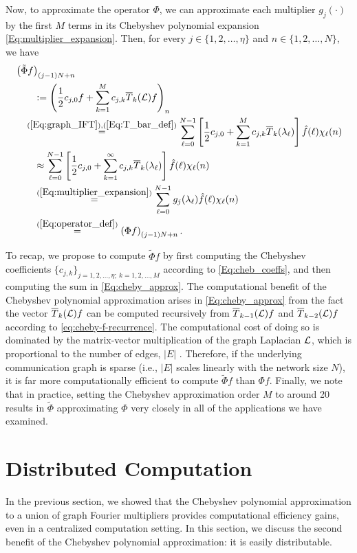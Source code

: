 \documentclass[conference]{IEEEtran}
\renewcommand{\l}{\ell}
\renewcommand{\L}{{\mathcal{L}}}
\def\L{{\cal L}}
\begin{document}
Now, to approximate the operator $\Phi$, we can approximate each multiplier $g_j(\cdot)$ by the first $M$ terms in its Chebyshev polynomial expansion \eqref{Eq:multiplier_expansion}.
Then,
for every $j \in \{1,2,\ldots,\eta\}$ and $n \in \{1,2,\ldots,N\}$, we have
\begin{align} \label{Eq:cheby_approx}
&\left(\tilde{\Phi} f\right)_{(j-1)N+n} \nonumber \\
&\quad\quad := \left(\frac{1}{2}c_{j,0}f+\sum_{k=1}^{M}c_{j,k}\overline{T}_k(\L)f\right)_n \\
&\quad \stackrel{(\ref{Eq:graph_IFT}), (\ref{Eq:T_bar_def})}= \sum_{\l=0}^{N-1}\left[\frac{1}{2}c_{j,0}+\sum_{k=1}^{M}c_{j,k}\overline{T}_k(\lambda_{\l})\right] \hat{f}(\l) \chi_{\l}(n) \nonumber \\
& \quad\quad \approx \sum_{\l=0}^{N-1}\left[\frac{1}{2}c_{j,0}+\sum_{k=1}^{\infty}c_{j,k}\overline{T}_k(\lambda_{\l})\right] \hat{f}(\l) \chi_{\l}(n)  \nonumber \\
&\quad\quad \stackrel{(\ref{Eq:multiplier_expansion})} = \sum_{\l=0}^{N-1}g_j(\lambda_{\l}) \hat{f}(\l) \chi_{\l}(n) \nonumber
\\
&\quad\quad \stackrel{(\ref{Eq:operator_def})} = \left(\Phi f\right)_{(j-1)N+n} . \nonumber
\end{align}


To recap, we propose to compute $\tilde{\Phi}f$ by first computing the Chebyshev coefficients $\{c_{j,k}\}_{j=1,2,\ldots,\eta;~k=1,2,\ldots,M}$ according to \eqref{Eq:cheb_coeffs}, and then computing the sum in \eqref{Eq:cheby_approx}. The computational benefit of the Chebyshev polynomial approximation arises in \eqref{Eq:cheby_approx}
from the fact the vector $\overline{T}_k(\L)f$ can be computed recursively from $\overline{T}_{k-1}(\L)f$ and $\overline{T}_{k-2}(\L)f$ according to \eqref{eq:cheby-f-recurrence}.
The computational cost of doing so is dominated by the matrix-vector multiplication of the graph Laplacian $\L$, which is proportional to the number of edges, $|E|$ \cite{LTS-ARTICLE-2009-053}. Therefore, if the underlying communication graph is sparse (i.e., $|E|$ scales linearly with the network size $N$), it is far more computationally efficient to compute $\tilde{\Phi}f$ than $\Phi f$. Finally, we note that in practice, setting the Chebyshev approximation order $M$ to around 20 results in $\tilde{\Phi}$ approximating $\Phi$ very closely in all of the applications we have examined.

\section{Distributed Computation} \label{Se:distribution}
In the previous section, we showed that the Chebyshev polynomial approximation to a union of graph Fourier multipliers provides computational efficiency gains, even in a centralized computation setting. In this section, we discuss the second benefit of the Chebyshev polynomial approximation: it is easily distributable.
\end{document}
